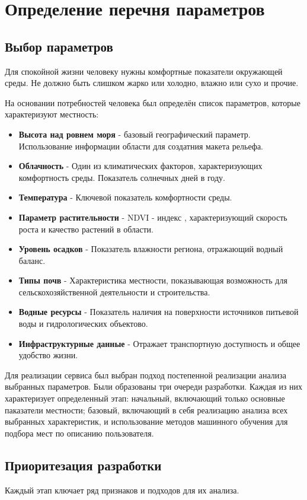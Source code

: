 \chapter{Определение перечня параметров}
\section{Выбор параметров}
Для спокойной жизни человеку нужны комфортные показатели окружающей среды. 
Не должно быть слишком жарко или холодно, влажно или сухо и прочие.

На основании потребностей человека был определён список параметров, которые характеризуют местность:
\begin{itemize}
	\item \textbf{Высота над ровнем моря} - базовый географический параметр. Использование информации  области для создатния макета рельефа.
	\item \textbf{Облачность} - Один из климатических факторов, характеризующих комфортность среды. Показатель солнечных дней в году.
	\item \textbf{Температура} - Ключевой показатель комфортности среды.
	\item \textbf{Параметр растительности} - NDVI - индекс \cite{Cherepanov2011}, характеризующий скорость роста и качество растений в области.
	\item \textbf{Уровень осадков} - Показатель влажности региона, отражающий водный баланс.
	\item \textbf{Типы почв} - Характеристика местности, показывающая возможность для сельскохозяйственной деятельности и строительства.
	\item \textbf{Водные ресурсы} - Показатель наличия на поверхности источников питьевой воды и гидрологических объектово.
	\item \textbf{Инфраструктурные данные} - Отражает транспортную доступность и общее удобство жизни.
\end{itemize}

Для реализации сервиса был выбран подход постепенной реализации анализа выбранных параметров.
Были образованы три очереди разработки. 
Каждая из них характеризует определенный этап: начальный, включающий только основные паказатели местности;  базовый, включающий в себя реализацию анализа всех выбранных характеристик, и использование методов машинного обучения для подбора мест по описанию пользователя.
\newpage
\section{Приоритезация разработки}
Каждый этап ключает ряд признаков и подходов для их анализа.

